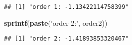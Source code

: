 \documentclass[]{article}
\newenvironment{Shaded}{\begin{snugshade}}{\end{snugshade}}
\newcommand{\KeywordTok}[1]{\textcolor[rgb]{0.13,0.29,0.53}{\textbf{#1}}}
\newcommand{\StringTok}[1]{\textcolor[rgb]{0.31,0.60,0.02}{#1}}
\newcommand{\NormalTok}[1]{#1}
\begin{document}
\begin{verbatim}
## [1] "order 1: -1.13422114758399"
\end{verbatim}

\begin{Shaded}
\begin{Highlighting}[]
\KeywordTok{sprintf}\NormalTok{(}\KeywordTok{paste}\NormalTok{(}\StringTok{'order 2:'}\NormalTok{, order2))}
\end{Highlighting}
\end{Shaded}

\begin{verbatim}
## [1] "order 2: -1.41893853320467"
\end{verbatim}
\end{document}

